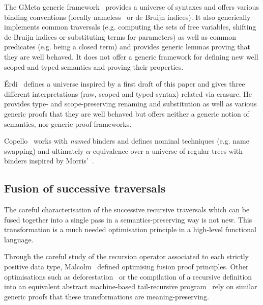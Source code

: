 {The GMeta generic framework~\citeyear{gmeta} provides a universe of syntaxes
and offers various binding conventions (locally nameless~\cite{Chargueraud2012}
or de Bruijn indices). It also generically implements common traversals (e.g. computing
the sets of free variables,
shifting
de Bruijn indices or substituting terms for parameters) as well as common
predicates (e.g. being a closed term) and provides generic lemmas proving that
they are well behaved. It does not offer a generic framework
for defining new well scoped-and-typed semantics and proving their properties.

Érdi~\citeyear{gergodraft} defines a universe inspired by a first draft of this
paper and gives three different interpretations (raw, scoped and typed syntax)
related via erasure. He provides type- and scope-preserving renaming and
substitution as well as various generic proofs that they are well behaved but
offers neither a generic notion of semantics, nor generic proof frameworks.

Copello~\citeyear{copello2017} works with \emph{named} binders and
defines nominal techniques (e.g. name swapping) and ultimately $\alpha$-equivalence
over a universe of regular trees with binders inspired by Morris'~\citeyear{morris-regulartt}.

\subsection{Fusion of successive traversals}

The careful characterisation of the successive recursive traversals which can be
fused together into a single pass in a semantics-preserving way is not new. This
transformation is a much needed optimisation principle in a high-level functional
language.

Through the careful study of the recursion operator associated to each
strictly positive data type,
Malcolm~\citeyear{DBLP:journals/scp/Malcolm90} defined optimising
fusion proof principles.
%
Other optimisations such as deforestation~\cite{DBLP:journals/tcs/Wadler90}
or the compilation of a recursive definition into an equivalent abstract
machine-based tail-recursive program~\cite{DBLP:conf/icfp/CortinasS18}
rely on similar generic proofs that these transformations are meaning-preserving.




}
